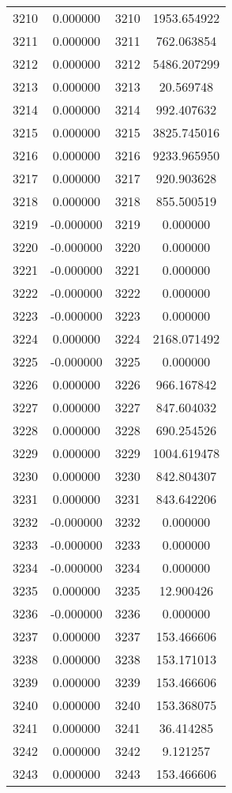 \documentclass[12pt]{article}
\begin{document}
\begin{longtable}{@{}cccc@{}}
3210 & 0.000000 & 3210 & 1953.654922 \\
3211 & 0.000000 & 3211 & 762.063854 \\
3212 & 0.000000 & 3212 & 5486.207299 \\
3213 & 0.000000 & 3213 & 20.569748 \\
3214 & 0.000000 & 3214 & 992.407632 \\
3215 & 0.000000 & 3215 & 3825.745016 \\
3216 & 0.000000 & 3216 & 9233.965950 \\
3217 & 0.000000 & 3217 & 920.903628 \\
3218 & 0.000000 & 3218 & 855.500519 \\
3219 & -0.000000 & 3219 & 0.000000 \\
3220 & -0.000000 & 3220 & 0.000000 \\
3221 & -0.000000 & 3221 & 0.000000 \\
3222 & -0.000000 & 3222 & 0.000000 \\
3223 & -0.000000 & 3223 & 0.000000 \\
3224 & 0.000000 & 3224 & 2168.071492 \\
3225 & -0.000000 & 3225 & 0.000000 \\
3226 & 0.000000 & 3226 & 966.167842 \\
3227 & 0.000000 & 3227 & 847.604032 \\
3228 & 0.000000 & 3228 & 690.254526 \\
3229 & 0.000000 & 3229 & 1004.619478 \\
3230 & 0.000000 & 3230 & 842.804307 \\
3231 & 0.000000 & 3231 & 843.642206 \\
3232 & -0.000000 & 3232 & 0.000000 \\
3233 & -0.000000 & 3233 & 0.000000 \\
3234 & -0.000000 & 3234 & 0.000000 \\
3235 & 0.000000 & 3235 & 12.900426 \\
3236 & -0.000000 & 3236 & 0.000000 \\
3237 & 0.000000 & 3237 & 153.466606 \\
3238 & 0.000000 & 3238 & 153.171013 \\
3239 & 0.000000 & 3239 & 153.466606 \\
3240 & 0.000000 & 3240 & 153.368075 \\
3241 & 0.000000 & 3241 & 36.414285 \\
3242 & 0.000000 & 3242 & 9.121257 \\
3243 & 0.000000 & 3243 & 153.466606 \\

\end{longtable}
\end{document}

